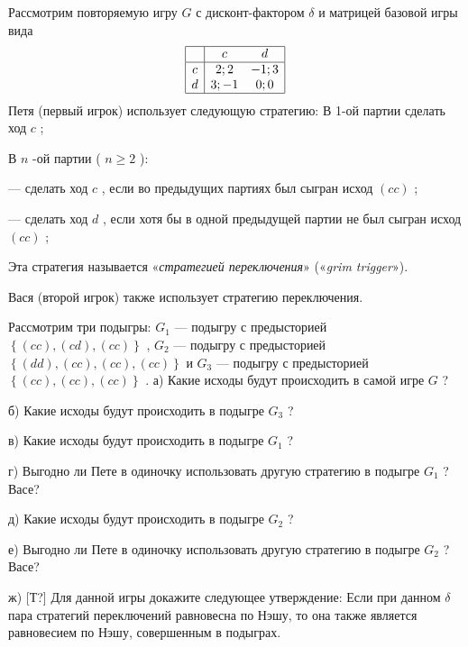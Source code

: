 \begin{problem}

Рассмотрим повторяемую игру  $G$  с дисконт-фактором  $\delta $  и матрицей базовой игры вида
\[\begin{array}{|c|cc|}  \hline {} & {c} & {d} \\  \hline {c} & {2;2} & {-1;3} \\ {d} & {3;-1} & {0;0} \\  \hline  \end{array}\]
Петя (первый игрок) использует следующую стратегию:
В 1-ой партии сделать ход  $c$ ;

В  $n$ -ой партии ( $n\ge 2$ ):

       — сделать ход  $c$ , если во  предыдущих партиях был сыгран исход  $\left(cc\right)$ ;

       — сделать ход  $d$ , если хотя бы в одной предыдущей партии не был сыгран исход  $\left(cc\right)$ ;

Эта стратегия называется «{\it стратегией переключения}» («{\it grim trigger}»).

Вася (второй игрок) также использует стратегию переключения.

Рассмотрим три подыгры:  $G_{1} $  — подыгру с предысторией  $\left\{\left(cc\right),\left(cd\right),\left(cc\right)\right\}$ ,  $G_{2} $  — подыгру с предысторией  $\left\{\left(dd\right),\left(cc\right),\left(cc\right),\left(cc\right)\right\}$  и  $G_{3} $  — подыгру с предысторией  $\left\{\left(cc\right),\left(cc\right),\left(cc\right)\right\}$ .
а) Какие исходы будут происходить в самой игре  $G$ ?\par
б) Какие исходы будут происходить в подыгре  $G_{3} $ ?\par
в) Какие исходы будут происходить в подыгре  $G_{1} $ ?\par
г) Выгодно ли Пете в одиночку использовать другую стратегию в подыгре  $G_{1} $ ? Васе?\par
д) Какие исходы будут происходить в подыгре  $G_{2} $ ?\par
е) Выгодно ли Пете в одиночку использовать другую стратегию в подыгре  $G_{2} $ ? Васе?\par
ж) [Т?] Для данной игры докажите следующее утверждение:
Если при данном  $\delta $  пара стратегий переключений равновесна по Нэшу, то она также является равновесием по Нэшу, совершенным в подыграх.



\begin{sol}

\end{sol}
\end{problem}



